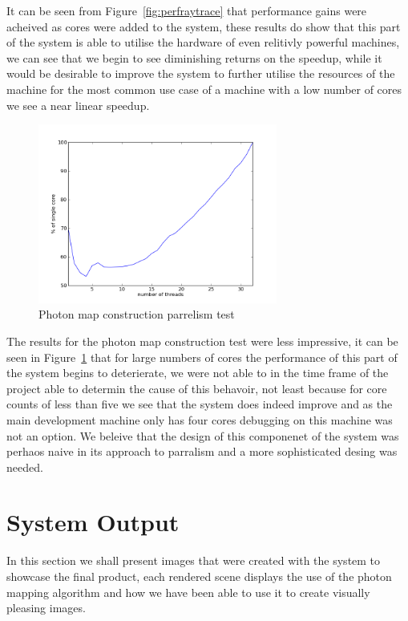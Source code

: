 It can be seen from Figure~\ref{fig:perfraytrace} that performance gains were
acheived as cores were added to the system, these results do show that this
part of the system is able to utilise the hardware of even relitivly powerful
machines, we can see that we begin to see diminishing returns on the speedup,
while it would be desirable to improve the system to further utilise the resources
of the machine for the most common use case of a machine with a low number of cores
we see a near linear speedup.

\begin{figure}[h]
\centering
\includegraphics[width=0.7\textwidth]{./images/results/photon_emission_slow_20.png}
\caption{Photon map construction parrelism test}
\label{fig:perfphotonmap}
\end{figure}

The results for the photon map construction test were less impressive, it can be seen
in Figure~\ref{fig:perfphotonmap} that for large
numbers of cores the performance of this part of the system begins to deterierate,
we were not able to in the time frame of the project able to determin the cause of
this behavoir, not least because for core counts of less than five we see that the
system does indeed improve and as the main development machine only has four cores
debugging on this machine was not an option. We beleive that the design of this
componenet of the system was perhaos naive in its approach to parralism and
a more sophisticated desing was needed.

\section{System Output}
In this section we shall present images that were created with the system to
showcase the final product, each rendered scene displays the use of the photon
mapping algorithm and how we have been able to use it to create visually
pleasing images.


